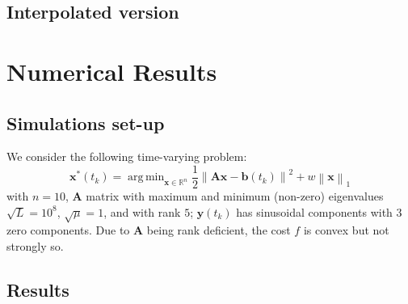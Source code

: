 \documentclass{article}
\DeclareMathOperator*{\argmin}{arg\,min}
\newcommand{\norm}[1]{\left\lVert#1\right\rVert}
\newcommand{\R}{\mathbb{R}}
\newcommand{\bv}{\mathbold{b}}
\newcommand{\x}{\mathbold{x}}
\newcommand{\y}{\mathbold{y}}
\newcommand{\Am}{\mathbold{A}}
\begin{document}
\subsection{Interpolated version}





\section{Numerical Results}\label{sec:numerical}


\subsection{Simulations set-up}
We consider the following time-varying problem:
\begin{equation}\label{eq:tv-problem}
	\x^*(t_k) = \argmin_{\x \in \R^n} \frac{1}{2} \norm{\Am \x - \bv(t_k)}^2 + w \norm{\x}_1
\end{equation}
with $n = 10$, $\Am$ matrix with maximum and minimum (non-zero) eigenvalues $\sqrt{L} = 10^8$, $\sqrt{\mu} = 1$, and with rank $5$; $\y(t_k)$ has sinusoidal components with $3$ zero components. Due to $\Am$ being rank deficient, the cost $f$ is convex but not strongly so.


\subsection{Results}






\end{document}
